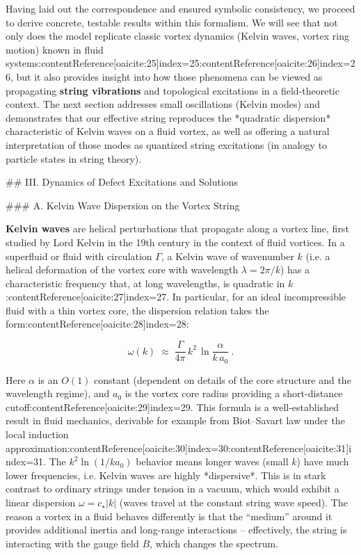 \documentclass[12pt]{article}
\begin{document}
Having laid out the correspondence and ensured symbolic consistency, we proceed to derive concrete, testable results within this formalism. We will see that not only does the model replicate classic vortex dynamics (Kelvin waves, vortex ring motion) known in fluid systems:contentReference[oaicite:25]{index=25}:contentReference[oaicite:26]{index=26}, but it also provides insight into how those phenomena can be viewed as propagating \textbf{string vibrations} and topological excitations in a field-theoretic context. The next section addresses small oscillations (Kelvin modes) and demonstrates that our effective string reproduces the *quadratic dispersion* characteristic of Kelvin waves on a fluid vortex, as well as offering a natural interpretation of those modes as quantized string excitations (in analogy to particle states in string theory).

## III. Dynamics of Defect Excitations and Solutions

### A. Kelvin Wave Dispersion on the Vortex String 

\textbf{Kelvin waves} are helical perturbations that propagate along a vortex line, first studied by Lord Kelvin in the 19th century in the context of fluid vortices. In a superfluid or fluid with circulation $\Gamma$, a Kelvin wave of wavenumber $k$ (i.e. a helical deformation of the vortex core with wavelength $\lambda = 2\pi/k$) has a characteristic frequency that, at long wavelengths, is quadratic in $k$:contentReference[oaicite:27]{index=27}. In particular, for an ideal incompressible fluid with a thin vortex core, the dispersion relation takes the form:contentReference[oaicite:28]{index=28}:

\[ \omega(k) \;\approx\; \frac{\Gamma}{4\pi} \, k^2 \,\ln\!\frac{\alpha}{k\,a_0}~. \tag{8}\] 

Here $\alpha$ is an $O(1)$ constant (dependent on details of the core structure and the wavelength regime), and $a_0$ is the vortex core radius providing a short-distance cutoff:contentReference[oaicite:29]{index=29}. This formula is a well-established result in fluid mechanics, derivable for example from Biot–Savart law under the local induction approximation:contentReference[oaicite:30]{index=30}:contentReference[oaicite:31]{index=31}. The $k^2 \ln(1/k a_0)$ behavior means longer waves (small $k$) have much lower frequencies, i.e. Kelvin waves are highly *dispersive*. This is in stark contrast to ordinary strings under tension in a vacuum, which would exhibit a linear dispersion $\omega = c_\star |k|$ (waves travel at the constant string wave speed). The reason a vortex in a fluid behaves differently is that the “medium” around it provides additional inertia and long-range interactions – effectively, the string is interacting with the gauge field $B$, which changes the spectrum.
\end{document}
